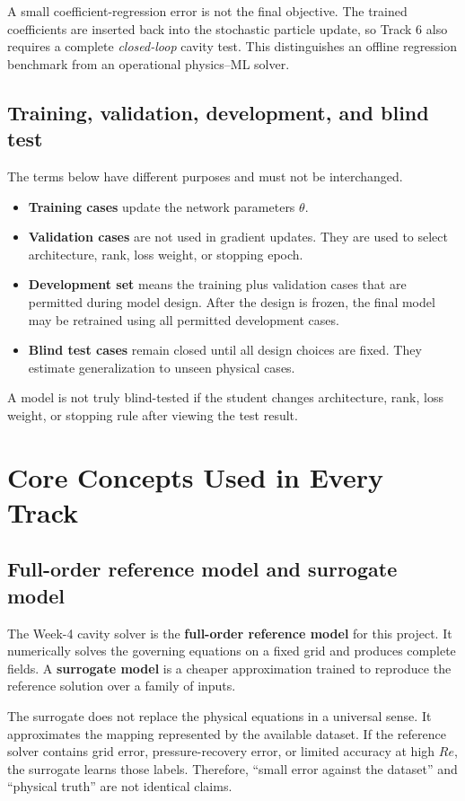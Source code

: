 \documentclass[11pt]{article}
\begin{document}
A small coefficient-regression error is not the final objective. The trained coefficients are inserted back into the stochastic particle update, so Track 6 also requires a complete \emph{closed-loop} cavity test. This distinguishes an offline regression benchmark from an operational physics--ML solver.

\subsection{Training, validation, development, and blind test}
The terms below have different purposes and must not be interchanged.
\begin{itemize}
\item \textbf{Training cases} update the network parameters $\theta$.
\item \textbf{Validation cases} are not used in gradient updates. They are used to select architecture, rank, loss weight, or stopping epoch.
\item \textbf{Development set} means the training plus validation cases that are permitted during model design. After the design is frozen, the final model may be retrained using all permitted development cases.
\item \textbf{Blind test cases} remain closed until all design choices are fixed. They estimate generalization to unseen physical cases.
\end{itemize}

A model is not truly blind-tested if the student changes architecture, rank, loss weight, or stopping rule after viewing the test result.

\section{Core Concepts Used in Every Track}
\subsection{Full-order reference model and surrogate model}
The Week-4 cavity solver is the \textbf{full-order reference model} for this project. It numerically solves the governing equations on a fixed grid and produces complete fields. A \textbf{surrogate model} is a cheaper approximation trained to reproduce the reference solution over a family of inputs.

The surrogate does not replace the physical equations in a universal sense. It approximates the mapping represented by the available dataset. If the reference solver contains grid error, pressure-recovery error, or limited accuracy at high $Re$, the surrogate learns those labels. Therefore, ``small error against the dataset'' and ``physical truth'' are not identical claims.
\end{document}
